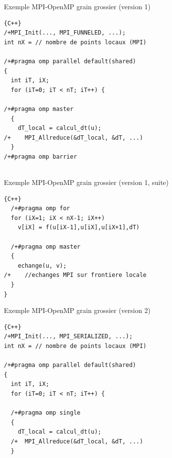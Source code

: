 \documentclass{beamer}
\begin{document}
\begin{frame}[fragile]
Exemple MPI-OpenMP grain grossier
(version 1)


\begin{lstlisting}[firstnumber=1]{C++}
/+MPI_Init(..., MPI_FUNNELED, ...);
int nX = // nombre de points locaux (MPI)
 
/+#pragma omp parallel default(shared)
{
  int iT, iX;
  for (iT=0; iT < nT; iT++) {
  
/+#pragma omp master
  {
    dT_local = calcul_dt(u);
/+    MPI_Allreduce(&dT_local, &dT, ...)
  }
/+#pragma omp barrier
  
\end{lstlisting}

\end{frame}
\begin{frame}[fragile]
	Exemple MPI-OpenMP grain grossier (version 1, suite)
	
	
\begin{lstlisting}[firstnumber=15]{C++}
  /+#pragma omp for
  for (iX=1; iX < nX-1; iX++)
    v[iX] = f(u[iX-1],u[iX],u[iX+1],dT)

  /+#pragma omp master
  {
    echange(u, v);
/+    //echanges MPI sur frontiere locale    
  }
}
\end{lstlisting}

\end{frame}
\begin{frame}[fragile]
	Exemple MPI-OpenMP grain grossier (version 2)
	
	
	\begin{lstlisting}[firstnumber=1]{C++}
/+MPI_Init(..., MPI_SERIALIZED, ...);
int nX = // nombre de points locaux (MPI)
	
/+#pragma omp parallel default(shared)
{
  int iT, iX;
  for (iT=0; iT < nT; iT++) {

  /+#pragma omp single
  {
    dT_local = calcul_dt(u);
  /+  MPI_Allreduce(&dT_local, &dT, ...)
  }
	
\end{lstlisting}
	
\end{frame}
\end{document}
